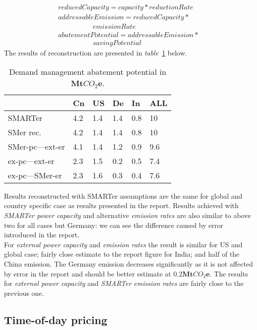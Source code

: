 \documentclass[11pt, twocolumn]{article}
\begin{document}
\begin{gather*}
  reducedCapacity = capacity * reductionRate\\
  addressableEmission = reducedCapacity *\\
  \quad\quad\quad\quad\quad emissionRate\\
  abatementPotential = addressableEmission *\\
  \quad\quad\quad\quad\quad savingPotential
\end{gather*}
The results of reconstruction are presented in \emph{table}~\ref{tab:dm} below.
\begin{center}
  \begin{table}[h]
    \begin{tabular}{ p{} | p{} | p{} | p{} | p{} | p{} }
       & Cn & US & De & In & ALL \\
      \hline
      SMARTer & 4.2 & 1.4 & 1.4 & 0.8 & 10 \\
      SMer rec. & 4.2 & 1.4 & 1.4 & 0.8 & 10 \\
      SMer-pc---ext-er & 4.1 & 1.4 & 1.2 & 0.9 & 9.6 \\
      ex-pc---ext-er & 2.3 & 1.5 & 0.2 & 0.5 & 7.4 \\
      ex-pc---SMer-er & 2.3 & 1.6 & 0.3 & 0.4 & 7.6
    \end{tabular}
    \caption{Demand management abatement potential in $\mathbf{Mt}CO_2\mathbf{e}$. \label{tab:dm}}
  \end{table}
\end{center}
Results reconstructed with SMARTer assumptions are the same for global and country specific case as results presented in the report. Results achieved with \emph{SMARTer power capacity} and alternative \emph{emission rates} are also similar to above two for all cases but Germany: we can see the difference caused by error introduced in the report.\\
For \emph{external power capacity} and \emph{emission rates} the result is similar for US and global case; fairly close estimate to the report figure for India; and half of the China emission. The Germany emission decreases significantly as it is not affected by error in the report and should be better estimate at $\mathbf{0.2Mt}CO_2\mathbf{e}$. The results for \emph{external power capacity} and \emph{SMARTer emission rates} are fairly close to the previous one.


\subsection{Time-of-day pricing}
\end{document}
